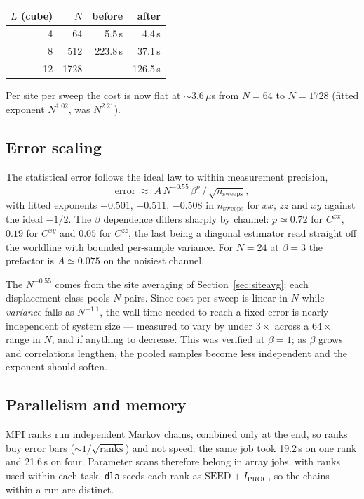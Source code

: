 \documentclass[11pt,a4paper]{article}
\newcommand{\code}[1]{\texttt{#1}}
\begin{document}
\begin{center}
\begin{tabular}{rrrr}
\toprule
$L$ (cube) & $N$ & before & after \\
\midrule
 4 &   64 &   5.5\,s &   4.4\,s \\
 8 &  512 & 223.8\,s &  37.1\,s \\
12 & 1728 &      --- & 126.5\,s \\
\bottomrule
\end{tabular}
\end{center}

Per site per sweep the cost is now flat at $\sim3.6\,\mu$s from $N=64$ to
$N=1728$ (fitted exponent $N^{1.02}$, was $N^{2.21}$).

\subsection{Error scaling}

The statistical error follows the ideal law to within measurement precision,
\begin{equation}
  \text{error} \;\approx\; A\, N^{-0.55}\, \beta^{p} \,/\, \sqrt{n_{\text{sweeps}}} ,
\end{equation}
with fitted exponents $-0.501$, $-0.511$, $-0.508$ in $n_{\text{sweeps}}$ for
$xx$, $zz$ and $xy$ against the ideal $-1/2$. The $\beta$ dependence differs
sharply by channel: $p\simeq0.72$ for $C^{xx}$, $0.19$ for $C^{xy}$ and $0.05$
for $C^{zz}$, the last being a diagonal estimator read straight off the
worldline with bounded per-sample variance. For $N=24$ at $\beta=3$ the
prefactor is $A\simeq0.075$ on the noisiest channel.

The $N^{-0.55}$ comes from the site averaging of Section~\ref{sec:siteavg}:
each displacement class pools $N$ pairs. Since cost per sweep is linear in $N$
while \emph{variance} falls as $N^{-1.1}$, the wall time needed to reach a fixed
error is nearly independent of system size --- measured to vary by under $3\times$
across a $64\times$ range in $N$, and if anything to decrease. This was verified
at $\beta=1$; as $\beta$ grows and correlations lengthen, the pooled samples
become less independent and the exponent should soften.

\subsection{Parallelism and memory}

MPI ranks run independent Markov chains, combined only at the end, so ranks buy
error bars ($\sim1/\sqrt{\text{ranks}}$) and not speed: the same job took
19.2\,s on one rank and 21.6\,s on four. Parameter scans therefore belong in
array jobs, with ranks used within each task. \code{dla} seeds each rank as
$\text{SEED} + I_{\text{PROC}}$, so the chains within a run are distinct.
\end{document}
